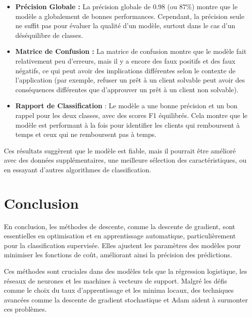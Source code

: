 \documentclass[12pt,a4paper,openay]{book}
\numberwithin{equation}{chapter}
\begin{document}
		\begin{itemize}
		\item \textbf{Pr\'ecision Globale :} La pr\'ecision globale de $0.98$ (ou $87\%$) montre que le mod\`ele a globalement de bonnes performances. Cependant, la pr\'ecision seule ne suffit pas pour \'evaluer la qualit\'e d'un mod\`ele, surtout dans le cas d'un d\'es\'equilibre de classes.
			
			\item \textbf{Matrice de Confusion :} La matrice de confusion montre que le mod\`ele fait relativement peu d'erreurs, mais il y a encore des faux positifs et des faux n\'egatifs, ce qui peut avoir des implications diff\'erentes selon le contexte de l'application (par exemple, refuser un pr\^et \`a un client solvable peut avoir des cons\'equences diff\'erentes que d'approuver un pr\^et \`a un client non solvable).
			
			\item \textbf{Rapport de Classification} : Le mod\`ele a une bonne pr\'ecision et un bon rappel pour les deux classes, avec des scores F1 \'equilibr\'es. Cela montre que le mod\`ele est performant \`a la fois pour identifier les clients qui remboursent \`a temps et ceux qui ne remboursent pas \`a temps.
		\end{itemize}
		
		Ces r\'esultats sugg\`erent que le mod\`ele est fiable, mais il pourrait \^etre am\'elior\'e avec des donn\'ees suppl\'ementaires, une meilleure s\'election des caract\'eristiques, ou en essayant d'autres algorithmes de classification.
	
	
	\newpage
	\backmatter
	
	\chapter{Conclusion}
	En conclusion, les m\'ethodes de descente, comme la descente de gradient, sont essentielles en optimisation et en apprentissage automatique, particuli\`erement pour la classification supervis\'ee. Elles ajustent les param\`etres des mod\`eles pour minimiser les fonctions de coût, am\'eliorant ainsi la pr\'ecision des pr\'edictions.
	
	Ces m\'ethodes sont cruciales dans des mod\`eles tels que la r\'egression logistique, les r\'eseaux de neurones et les machines \`a vecteurs de support. Malgr\'e les d\'efis comme le choix du taux d'apprentissage et les minima locaux, des techniques avanc\'ees comme la descente de gradient stochastique et Adam aident \`a surmonter ces probl\`emes.
	
\end{document}
